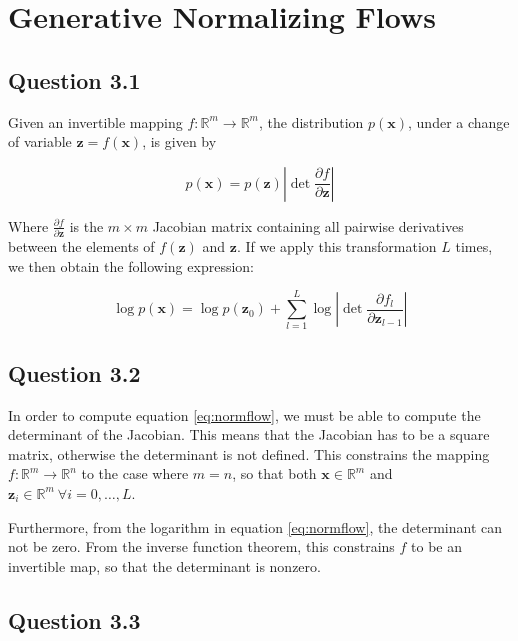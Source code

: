 \documentclass{article}
\begin{document}
\section{Generative Normalizing Flows}

\subsection*{Question 3.1}

Given an invertible mapping $f : \mathbb{R}^m \to \mathbb{R}^m$, the distribution $p(\mathbf{x})$, under a change of variable $\mathbf{z} = f(\mathbf{x})$, is given by

\begin{equation*}
p(\mathbf{x}) = p(\mathbf{z})\left\vert \det\frac{\partial f}{\partial\mathbf{z}} \right\vert
\end{equation*}

Where $\frac{\partial f}{\partial\mathbf{z}}$ is the $m\times m$ Jacobian matrix containing all pairwise derivatives between the elements of $f(\mathbf{z})$  and $\mathbf{z}$. If we apply this transformation $L$ times, we then obtain the following expression:

\begin{equation}
\log p(\mathbf{x}) = \log p(\mathbf{z}_0) + \sum_{l=1}^L \log \left\vert \det\frac{\partial f_l}{\partial\mathbf{z}_{l-1}} \right\vert
\label{eq:normflow}
\end{equation}

\subsection*{Question 3.2}

In order to compute equation \ref{eq:normflow}, we must be able to compute the determinant of the Jacobian. This means that the Jacobian has to be a square matrix, otherwise the determinant is not defined. This constrains the mapping $f : \mathbb{R}^m \to \mathbb{R}^n$ to the case where $m = n$, so that both $\mathbf{x}\in\mathbb{R}^m$ and $\mathbf{z}_i\in\mathbb{R}^m\ \forall i = 0, \dots, L$.

Furthermore, from the logarithm in equation \ref{eq:normflow}, the determinant can not be zero. From the inverse function theorem, this constrains $f$ to be an invertible map, so that the determinant is nonzero.

\subsection*{Question 3.3}
\end{document}
